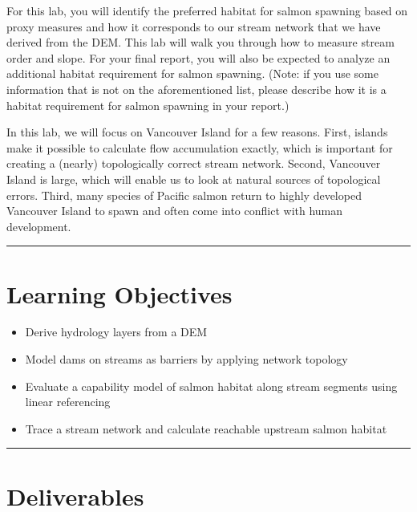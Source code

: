\documentclass[
]{book}
\begin{document}
For this lab, you will identify the preferred habitat for salmon spawning based on proxy measures and how it corresponds to our stream network that we have derived from the DEM. This lab will walk you through how to measure stream order and slope. For your final report, you will also be expected to analyze an additional habitat requirement for salmon spawning. (Note: if you use some information that is not on the aforementioned list, please describe how it is a habitat requirement for salmon spawning in your report.)

In this lab, we will focus on Vancouver Island for a few reasons. First, islands make it possible to calculate flow accumulation exactly, which is important for creating a (nearly) topologically correct stream network. Second, Vancouver Island is large, which will enable us to look at natural sources of topological errors. Third, many species of Pacific salmon return to highly developed Vancouver Island to spawn and often come into conflict with human development.

\begin{center}\rule{0.5\linewidth}{0.5pt}\end{center}

\hypertarget{learning-objectives-1}{%
\section*{Learning Objectives}\label{learning-objectives-1}}

\begin{itemize}
\item
  Derive hydrology layers from a DEM
\item
  Model dams on streams as barriers by applying network topology
\item
  Evaluate a capability model of salmon habitat along stream segments using linear referencing
\item
  Trace a stream network and calculate reachable upstream salmon habitat
\end{itemize}

\begin{center}\rule{0.5\linewidth}{0.5pt}\end{center}

\hypertarget{lab2-deliverables}{%
\section*{Deliverables}\label{lab2-deliverables}}
\end{document}

